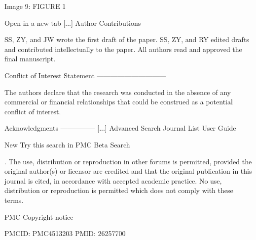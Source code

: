\documentclass[12pt]{article}
\begin{document}
Image 9: FIGURE 1

Open in a new tab [...] Author Contributions
--------------------

SS, ZY, and JW wrote the first draft of the paper. SS, ZY, and RY edited drafts and contributed intellectually to the paper. All authors read and approved the final manuscript.

Conflict of Interest Statement
------------------------------

The authors declare that the research was conducted in the absence of any commercial or financial relationships that could be construed as a potential conflict of interest.

Acknowledgments
--------------- [...] Advanced Search
   Journal List
   User Guide

New Try this search in PMC Beta Search

   . The use, distribution or reproduction in other forums is permitted, provided the original author(s) or licensor are credited and that the original publication in this journal is cited, in accordance with accepted academic practice. No use, distribution or reproduction is permitted which does not comply with these terms.

PMC Copyright notice

PMCID: PMC4513203 PMID: 26257700
\end{document}
